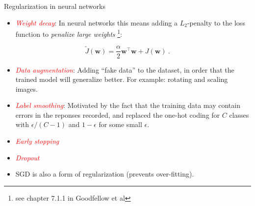 \documentclass[
  10pt,
  ignorenonframetext,
]{beamer}
\providecommand{\tightlist}{%
  \setlength{\itemsep}{0pt}\setlength{\parskip}{0pt}}
\begin{document}
\begin{frame}
\begin{block}{Regularization in neural networks}
\protect\hypertarget{regularization-in-neural-networks}{}
\(~\)

\begin{itemize}
\tightlist
\item
  \emph{\textcolor{red}{Weight decay}}: In neural networks this means
  adding a \(L_2\)-penalty to the loss function to \emph{penalize large
  weights} \footnote{see chapter 7.1.1 in Goodfellow et al}:
\end{itemize}

\[ \tilde{J}({\boldsymbol w})= \frac{\alpha}{2}{{\boldsymbol w}^\top{\boldsymbol w}} + J({\boldsymbol w}) \ .\]

\vspace{2mm}

\begin{itemize}
\tightlist
\item
  \emph{\textcolor{red}{Data augmentation}}: Adding ``fake data'' to the
  dataset, in order that the trained model will generalize better. For
  example: rotating and scaling images.
\end{itemize}

\vspace{2mm}

\begin{itemize}
\tightlist
\item
  \emph{\textcolor{red}{Label smoothing}}: Motivated by the fact that
  the training data may contain errors in the reponses recorded, and
  replaced the one-hot coding for \(C\) classes with \(\epsilon/(C-1)\)
  and \(1-\epsilon\) for some small \(\epsilon\).
\end{itemize}

\vspace{2mm}

\begin{itemize}
\tightlist
\item
  \emph{\textcolor{red}{Early stopping}}
\end{itemize}

\vspace{2mm}

\begin{itemize}
\tightlist
\item
  \emph{\textcolor{red}{Dropout}}
\end{itemize}

\vspace{2mm}

\begin{itemize}
\tightlist
\item
  SGD is also a form of regularization (prevents over-fitting).
\end{itemize}
\end{block}
\end{frame}
\end{document}
